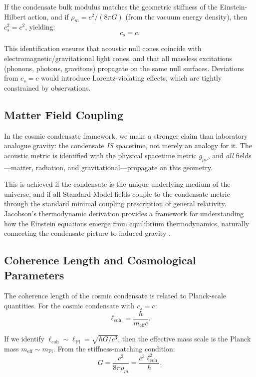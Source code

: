 \documentclass[11pt,a4paper]{article}
\theoremstyle{definition}
\begin{document}
If the condensate bulk modulus matches the geometric stiffness of the Einstein-Hilbert action, and if $\rho_m = c^2/(8\pi G)$ (from the vacuum energy density), then $c_s^2 = c^2$, yielding:
\begin{equation}
\label{eq:cs_equals_c}
\boxed{c_s = c.}
\end{equation}

This identification ensures that acoustic null cones coincide with electromagnetic/gravitational light cones, and that all massless excitations (phonons, photons, gravitons) propagate on the same null surfaces. Deviations from $c_s = c$ would introduce Lorentz-violating effects, which are tightly constrained by observations.

\subsection{Matter Field Coupling}
\label{sec:matter_coupling}

In the cosmic condensate framework, we make a stronger claim than laboratory analogue gravity: the condensate \emph{IS} spacetime, not merely an analogy for it. The acoustic metric is identified with the physical spacetime metric $g_{\mu\nu}$, and \emph{all} fields---matter, radiation, and gravitational---propagate on this geometry.

This is achieved if the condensate is the unique underlying medium of the universe, and if all Standard Model fields couple to the condensate metric through the standard minimal coupling prescription of general relativity. Jacobson's thermodynamic derivation \cite{Jacobson1995} provides a framework for understanding how the Einstein equations emerge from equilibrium thermodynamics, naturally connecting the condensate picture to induced gravity \cite{Sakharov,Zee1981,Padmanabhan2010}.

\subsection{Coherence Length and Cosmological Parameters}
\label{sec:coherence_length}

The coherence length of the cosmic condensate is related to Planck-scale quantities. For the cosmic condensate with $c_s = c$:
\begin{equation}
\label{eq:cosmic_coherence}
\ell_{\mathrm{coh}} = \frac{\hbar}{m_{\mathrm{eff}} c}.
\end{equation}

If we identify $\ell_{\mathrm{coh}} \sim \ell_{\mathrm{Pl}} = \sqrt{\hbar G/c^3}$, then the effective mass scale is the Planck mass $m_{\mathrm{eff}} \sim m_{\mathrm{Pl}}$. From the stiffness-matching condition:
\begin{equation}
\label{eq:G_from_lcoh}
G = \frac{c^2}{8\pi \rho_m} = \frac{c^3 \ell_{\mathrm{coh}}^2}{\hbar}.
\end{equation}
\end{document}
